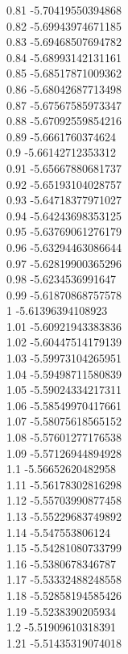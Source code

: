 {0.81	-5.70419550394868\\
0.82	-5.69943974671185\\
0.83	-5.69468507694782\\
0.84	-5.68993142131161\\
0.85	-5.68517871009362\\
0.86	-5.68042687713498\\
0.87	-5.67567585973347\\
0.88	-5.67092559854216\\
0.89	-5.6661760374624\\
0.9	-5.66142712353312\\
0.91	-5.65667880681737\\
0.92	-5.65193104028757\\
0.93	-5.64718377971027\\
0.94	-5.64243698353125\\
0.95	-5.63769061276179\\
0.96	-5.63294463086644\\
0.97	-5.62819900365296\\
0.98	-5.6234536991647\\
0.99	-5.61870868757578\\
1	-5.61396394108923\\
1.01	-5.60921943383836\\
1.02	-5.60447514179139\\
1.03	-5.59973104265951\\
1.04	-5.59498711580839\\
1.05	-5.59024334217311\\
1.06	-5.58549970417661\\
1.07	-5.58075618565152\\
1.08	-5.57601277176538\\
1.09	-5.57126944894928\\
1.1	-5.56652620482958\\
1.11	-5.56178302816298\\
1.12	-5.55703990877458\\
1.13	-5.55229683749892\\
1.14	-5.547553806124\\
1.15	-5.54281080733799\\
1.16	-5.5380678346787\\
1.17	-5.53332488248558\\
1.18	-5.52858194585426\\
1.19	-5.5238390205934\\
1.2	-5.51909610318391\\
1.21	-5.51435319074018\\
}
